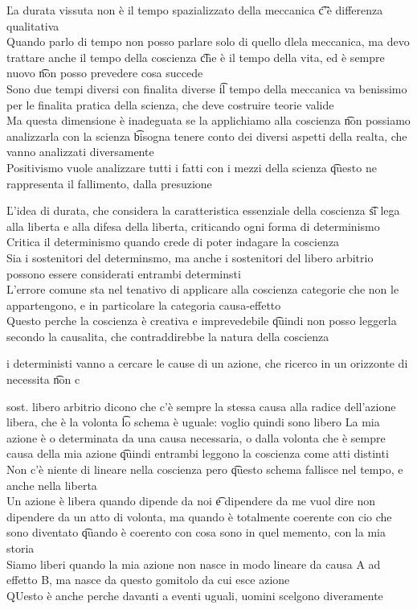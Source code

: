\documentclass[12pt]{article}
\begin{document}
\v

La durata vissuta non è il tempo spazializzato della meccanica \t c'è differenza qualitativa \\
Quando parlo di tempo non posso parlare solo di quello dlela meccanica, ma devo trattare anche il tempo della coscienza \t che è il tempo della vita, ed è sempre nuovo \t non posso prevedere cosa succede \\
Sono due tempi diversi con finalita diverse \t il tempo della meccanica va benissimo per le finalita pratica della scienza, che deve costruire teorie valide \\
Ma questa dimensione è inadeguata se la applichiamo alla coscienza \t non possiamo analizzarla con la scienza \t bisogna tenere conto dei diversi aspetti della realta, che vanno analizzati diversamente \\
Positivismo vuole analizzare tutti i fatti con i mezzi della scienza \t questo ne rappresenta il fallimento, dalla presuzione

\v

L'idea di durata, che considera la caratteristica essenziale della coscienza \t si lega alla liberta e alla difesa della liberta, criticando ogni forma di determinismo \\
Critica il determinismo quando crede di poter indagare la coscienza \\
Sia i sostenitori del determinsmo, ma anche i sostenitori del libero arbitrio possono essere considerati entrambi determinsti \\
L'errore comune sta nel tenativo di applicare alla coscienza categorie che non le appartengono, e in particolare la categoria causa-effetto \\
Questo perche la coscienza è creativa e imprevedebile \t quindi non posso leggerla secondo la causalita, che contraddirebbe la natura della coscienza \\
\bi
\item i deterministi vanno a cercare le cause di un azione, che ricerco in un orizzonte di necessita \t non c
\item sost. libero arbitrio dicono che c'è sempre la stessa causa alla radice dell'azione libera, che è la volonta \t lo schema è uguale: voglio quindi sono libero
\ei
La mia azione è o determinata da una causa necessaria, o dalla volonta che è sempre causa della mia azione \t quindi entrambi leggono la coscienza come atti distinti \\
Non c'è niente di lineare nella coscienza pero \t questo schema fallisce nel tempo, e anche nella liberta \\
Un azione è libera quando dipende da noi \t e dipendere da me vuol dire non dipendere da un atto di volonta, ma quando è totalmente coerente con cio che sono diventato \t quando è coerento con cosa sono in quel memento, con la mia storia \\
Siamo liberi quando la mia azione non nasce in modo lineare da causa A ad effetto B, ma nasce da questo gomitolo da cui esce azione \\
QUesto è anche perche davanti a eventi uguali, uomini scelgono diveramente
\end{document}
